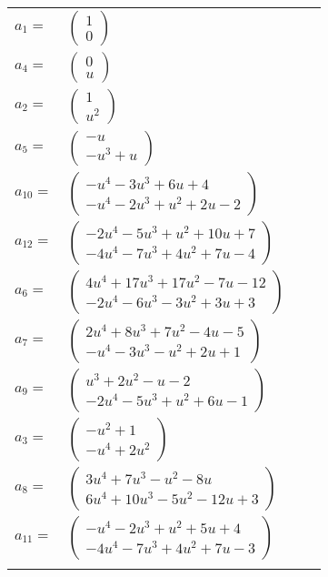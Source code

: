 \documentclass[1p]{elsarticle_modified}
\theoremstyle{definition}
\begin{document}
\begin{tabular}{m{7pt} m{180pt} m{7pt} m{180pt} }
\flushright $a_{1}=$&$\begin{pmatrix}1\\0\end{pmatrix}$ \\
\flushright $a_{4}=$&$\begin{pmatrix}0\\u\end{pmatrix}$ \\
\flushright $a_{2}=$&$\begin{pmatrix}1\\u^2\end{pmatrix}$ \\
\flushright $a_{5}=$&$\begin{pmatrix}- u\\- u^3+u\end{pmatrix}$ \\
\flushright $a_{10}=$&$\begin{pmatrix}- u^4-3 u^3+6 u+4\\- u^4-2 u^3+u^2+2 u-2\end{pmatrix}$ \\
\flushright $a_{12}=$&$\begin{pmatrix}-2 u^4-5 u^3+u^2+10 u+7\\-4 u^4-7 u^3+4 u^2+7 u-4\end{pmatrix}$ \\
\flushright $a_{6}=$&$\begin{pmatrix}4 u^4+17 u^3+17 u^2-7 u-12\\-2 u^4-6 u^3-3 u^2+3 u+3\end{pmatrix}$ \\
\flushright $a_{7}=$&$\begin{pmatrix}2 u^4+8 u^3+7 u^2-4 u-5\\- u^4-3 u^3- u^2+2 u+1\end{pmatrix}$ \\
\flushright $a_{9}=$&$\begin{pmatrix}u^3+2 u^2- u-2\\-2 u^4-5 u^3+u^2+6 u-1\end{pmatrix}$ \\
\flushright $a_{3}=$&$\begin{pmatrix}- u^2+1\\- u^4+2 u^2\end{pmatrix}$ \\
\flushright $a_{8}=$&$\begin{pmatrix}3 u^4+7 u^3- u^2-8 u\\6 u^4+10 u^3-5 u^2-12 u+3\end{pmatrix}$ \\
\flushright $a_{11}=$&$\begin{pmatrix}- u^4-2 u^3+u^2+5 u+4\\-4 u^4-7 u^3+4 u^2+7 u-3\end{pmatrix}$\\&\end{tabular}
\end{document}
